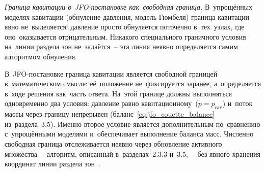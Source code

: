 \textit{Граница кавитации в~JFO-постановке как~свободная граница.}
В~упрощённых моделях кавитации (обнуление давления, модель Гюмбеля) граница кавитации явно не~выделяется: давление просто обнуляется поточечно в~тех~узлах, где оно~оказывается отрицательным. Никакого специального граничного условия на~линии раздела зон не~задаётся~-- эта линия неявно определяется самим алгоритмом обнуления.

В~JFO-постановке граница кавитации является свободной границей в~математическом смысле: её~положение не~фиксируется заранее, а~определяется в~ходе решения как~часть ответа. На~этой границе должны выполняться одновременно два условия: давление равно кавитационному~($p = p_{\mathrm{cav}}$) и~поток массы через границу непрерывен (баланс~\eqref{eq:jfo_couette_balance} из~раздела~3.5). Именно второе условие является дополнительным по~сравнению с~упрощёнными моделями и~обеспечивает выполнение баланса масс. Численно свободная граница отслеживается неявно через обновление активного множества~-- алгоритм, описанный в~разделах~2.3.3 и~3.5,~-- без явного хранения координат линии раздела зон~\cite{hori2002,szeri1998}.
